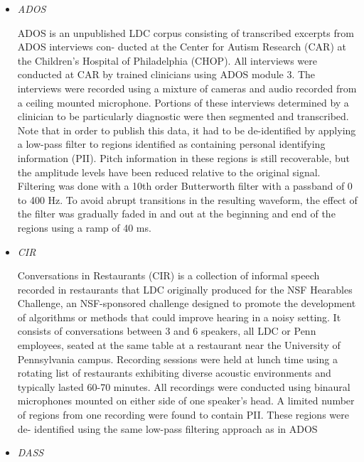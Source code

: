 \begin{itemize}
\item \emph{ADOS}

ADOS is an unpublished LDC corpus consisting of transcribed excerpts from ADOS interviews con- ducted at the Center for Autism Research (CAR) at the Children’s Hospital of Philadelphia (CHOP). All interviews were conducted at CAR by trained clinicians using ADOS module 3. The interviews were recorded using a mixture of cameras and audio recorded from a ceiling mounted microphone. Portions of these interviews determined by a clinician to be particularly diagnostic were then segmented and transcribed.
Note that in order to publish this data, it had to be de-identified by applying a low-pass filter to regions identified as containing personal identifying information (PII). Pitch information in these regions is still recoverable, but the amplitude levels have been reduced relative to the original signal. Filtering was done with a 10th order Butterworth filter with a passband of 0 to 400 Hz. To avoid abrupt transitions in the resulting waveform, the effect of the filter was gradually faded in and out at the beginning and end of the regions using a ramp of 40 ms.

\item \emph{CIR}

Conversations in Restaurants (CIR) is a collection of informal speech recorded in restaurants that LDC originally produced for the NSF Hearables Challenge, an NSF-sponsored challenge designed to promote the development of algorithms or methods that could improve hearing in a noisy setting. It consists of conversations between 3 and 6 speakers, all LDC or Penn employees, seated at the same table at a restaurant near the University of Pennsylvania campus. Recording sessions were held at lunch time using a rotating list of restaurants exhibiting diverse acoustic environments and typically lasted 60-70 minutes. All recordings were conducted using binaural microphones mounted on either side of one speaker’s head.
A limited number of regions from one recording were found to contain PII. These regions were de- identified using the same low-pass filtering approach as in ADOS

\item \emph{DASS}


\end{itemize}
